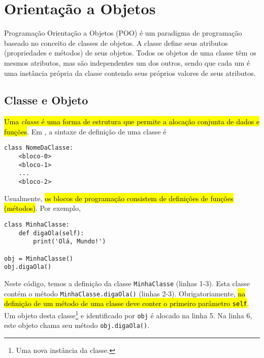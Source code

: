 
\chapter{Orientação a Objetos}\label{cap_poo}
\thispagestyle{fancy}

Programação Orientação a Objetos (POO) é um paradigma de programação baseado no conceito de classes de objetos. A classe define seus atributos (propriedades e métodos) de seus objetos. Todos os objetos de uma classe têm os mesmos atributos, mas são independentes um dos outros, sendo que cada um é uma instância própria da classe contendo seus próprios valores de seus atributos.

\section{Classe e Objeto}\label{cap_ob_sec_class}

\hl{Uma \emph{classe} é uma forma de estrutura que permite a alocação conjunta de dados e funções}. Em {\python}, a sintaxe de definição de uma classe é

\begin{lstlisting}
class NomeDaClasse:
    <bloco-0>
    <bloco-1>
    ...
    <bloco-2>
\end{lstlisting}

Usualmente, \hl{os blocos de programação consistem de definições de funções (métodos)}. Por exemplo,

\begin{lstlisting}
class MinhaClasse:
    def digaOla(self):
        print('Olá, Mundo!')

obj = MinhaClasse()
obj.digaOla()
\end{lstlisting}

Neste código, temos a definição da classe \lstinline+MinhaClasse+ (linhas 1-3). Esta classe contém o método \lstinline+MinhaClasse.digaOla()+ (linhas 2-3). Obrigatoriamente, \hl{na definição de um método de uma classe deve conter o primeiro parâmetro {\lstinline+self+}}. Um objeto desta classe\footnote{Uma nova instância da classe.} e identificado por \lstinline+obj+ é alocado na linha 5. Na linha 6, este objeto chama seu método \lstinline+obj.digaOla()+.


